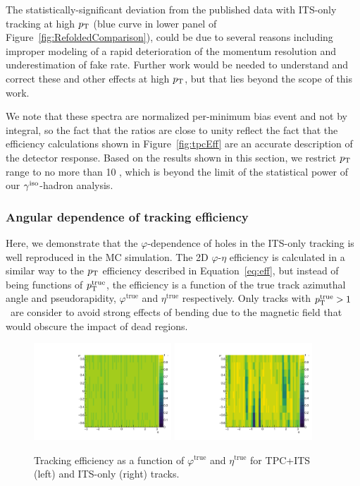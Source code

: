 The statistically-significant deviation from the published data with ITS-only tracking at high $p_{\mathrm{T}}$ (blue curve in lower panel of Figure~\ref{fig:RefoldedComparison}), could be due to several reasons  including improper modeling of a rapid deterioration of the momentum resolution and underestimation of fake rate. Further work would be needed to understand and correct these and other effects at high $p_{\mathrm{T}}$, but that lies beyond the scope of this work. 

We note that these spectra are normalized per-minimum bias event and not by integral, so the fact that the ratios are close to unity reflect the fact that the efficiency calculations shown in Figure~\ref{fig:tpcEff} are an accurate description of the detector response. Based on the results shown in this section, we restrict $p_{\mathrm{T}}$ range to no more than 10 \GeVc, which is beyond the limit of the statistical power of our $\gamma^\mathrm{iso}$-hadron analysis. 

\FloatBarrier
\subsubsection{Angular dependence of tracking efficiency}
Here, we demonstrate that the $\varphi$-dependence of holes in the ITS-only tracking is well reproduced in the MC simulation. The 2D $\varphi$-$\eta$ efficiency is calculated in a similar way to the $p_{\mathrm{T}}$ efficiency described in Equation~\ref{eq:eff}, but instead of being functions of $p_{\mathrm{T}}^{\mathrm{true}}$, the efficiency is a function of the true track azimuthal angle and pseudorapidity, $\varphi^{\mathrm{true}}$ and $\eta^{\mathrm{true}}$ respectively. Only tracks with {$p_{\mathrm{T}}^{\mathrm{true}}>1$} \GeVc~are consider to avoid strong effects of bending due to the magnetic field that would obscure the impact of dead regions.

\begin{figure}[h]
\center
\includegraphics[width=0.46\textwidth]{Tracking/etaPhi_eff_tpc.pdf}
\includegraphics[width=0.46\textwidth]{Tracking/etaPhi_eff_4layers.pdf}
\caption{Tracking efficiency as a function of $\varphi^{\mathrm{true}}$ and $\eta^{\mathrm{true}}$ for TPC+ITS (left) and ITS-only (right) tracks.}
\label{fig:2Defficiency}
\end{figure}

